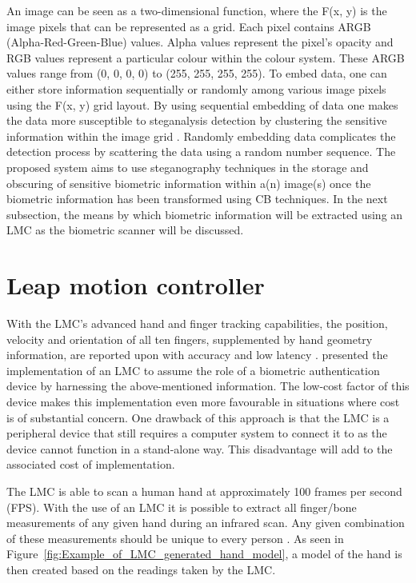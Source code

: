 An image can be seen as a two-dimensional function, where the F(x, y) is the image pixels that can be represented as a grid. Each pixel contains ARGB (Alpha-Red-Green-Blue) values. Alpha values represent the pixel’s opacity and RGB values represent a particular colour within the colour system. These ARGB values range from (0, 0, 0, 0) to (255, 255, 255, 255). To embed data, one can either store information sequentially or randomly among various image pixels using the F(x, y) grid layout. By using sequential embedding of data one makes the data more susceptible to steganalysis detection by clustering the sensitive information within the image grid \citep{Laskar2013}. Randomly embedding data complicates the detection process by scattering the data using a random number sequence. The proposed system aims to use steganography techniques in the storage and obscuring of sensitive biometric information within a(n) image(s) once the biometric information has been transformed using CB techniques. In the next subsection, the means by which biometric information will be extracted using an LMC as the biometric scanner will be discussed.


\section[Leap motion controller ]{Leap motion controller }

With the LMC’s advanced hand and finger tracking capabilities, the position, velocity and orientation of all ten fingers, supplemented by hand geometry information, are reported upon with accuracy and low latency \citep{SyedAhmad2012}. \cite{Chan2015}  presented the implementation of an LMC to assume the role of a biometric authentication device by harnessing the above-mentioned information. The low-cost factor of this device makes this implementation even more favourable in situations where cost is of substantial concern. One drawback of this approach is that the LMC is a peripheral device that still requires a computer system to connect it to as the device cannot function in a stand-alone way. This disadvantage will add to the associated cost of implementation.

The LMC is able to scan a human hand at approximately 100 frames per second (FPS). With the use of an LMC it is possible to extract all finger/bone measurements of any given hand during an infrared scan. Any given combination of these measurements should be unique to every person \citep{Chan2015}. As seen in Figure~\ref{fig:Example_of_LMC_generated_hand_model}, a model of the hand is then created based on the readings taken by the LMC.

